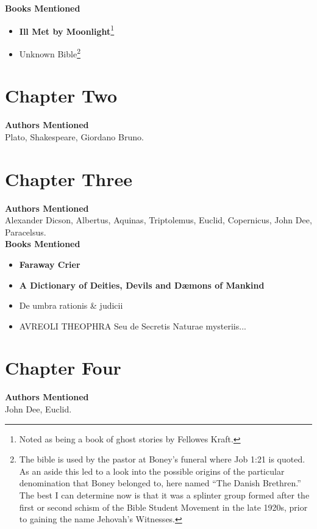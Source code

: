 \documentclass[12pt,makeidx]{extreport}
\begin{document}
\hspace{-1.5em}\textbf{Books Mentioned}
\begin{itemize}
\item \textbf{Ill Met by Moonlight}\footnote{Noted as being a book of ghost stories by Fellowes Kraft.} \cite{KraftIll}
\item Unknown Bible\footnote{The bible is used by the pastor at Boney’s funeral where Job 1:21 is quoted. As an aside this led to a look into the possible origins of the particular denomination that Boney belonged to, here named ``The Danish Brethren.'' The best I can determine now is that it was a splinter group formed after the first or second schism of the Bible Student Movement in the late 1920s, prior to gaining the name Jehovah’s Witnesses.}
\end{itemize}

\section{Chapter Two}
\textbf{Authors Mentioned}\\
Plato, Shakespeare, Giordano Bruno.

\section{Chapter Three}
\textbf{Authors Mentioned}\\
Alexander Dicson, Albertus, Aquinas, Triptolemus, Euclid, Copernicus, John Dee, Paracelsus.
\\

\hspace{-1.5em}\textbf{Books Mentioned}
\begin{itemize}
\item \textbf{Faraway Crier} \cite{faraway}
\item \textbf{A Dictionary of Deities, Devils and Dæmons of Mankind} \cite{St.Phalle}
\item De umbra rationis \& judicii \cite{Dicson1584}
\item AVREOLI THEOPHRA Seu de Secretis Naturae mysteriis... \cite{Paracelsus1582}
\end{itemize}

\section{Chapter Four}
\textbf{Authors Mentioned}\\
John Dee, Euclid.
\\
\end{document}
